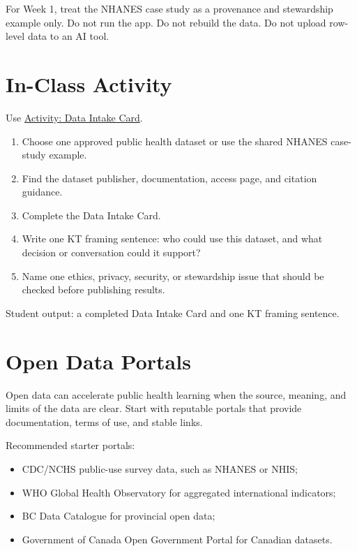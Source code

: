 \documentclass[
  letterpaper,
  DIV=11,
  numbers=noendperiod,
  oneside]{scrreprt}
\providecommand{\tightlist}{%
  \setlength{\itemsep}{0pt}\setlength{\parskip}{0pt}}
\begin{document}
For Week 1, treat the NHANES case study as a provenance and stewardship
example only. Do not run the app. Do not rebuild the data. Do not upload
row-level data to an AI tool.

\section*{In-Class Activity}\label{in-class-activity}


Use \href{activity-data-intake-card.qmd}{Activity: Data Intake Card}.

\begin{enumerate}
\def\labelenumi{\arabic{enumi}.}
\tightlist
\item
  Choose one approved public health dataset or use the shared NHANES
  case-study example.
\item
  Find the dataset publisher, documentation, access page, and citation
  guidance.
\item
  Complete the Data Intake Card.
\item
  Write one KT framing sentence: who could use this dataset, and what
  decision or conversation could it support?
\item
  Name one ethics, privacy, security, or stewardship issue that should
  be checked before publishing results.
\end{enumerate}

Student output: a completed Data Intake Card and one KT framing
sentence.

\section*{Open Data Portals}\label{open-data-portals}


Open data can accelerate public health learning when the source,
meaning, and limits of the data are clear. Start with reputable portals
that provide documentation, terms of use, and stable links.

Recommended starter portals:

\begin{itemize}
\tightlist
\item
  CDC/NCHS public-use survey data, such as NHANES or NHIS;
\item
  WHO Global Health Observatory for aggregated international indicators;
\item
  BC Data Catalogue for provincial open data;
\item
  Government of Canada Open Government Portal for Canadian datasets.
\end{itemize}
\end{document}
